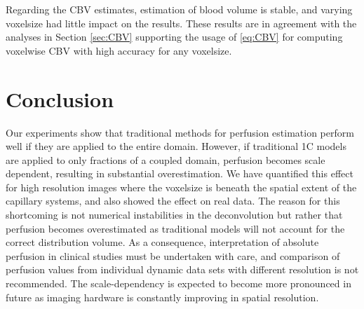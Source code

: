\documentclass[final,5p,times,twocolumn]{elsarticle}
\begin{document}
	Regarding the CBV estimates, estimation of blood volume is stable, and varying voxelsize had little impact on the results. These results are in agreement with the analyses in Section \ref{sec:CBV} supporting the usage of \eqref{eq:CBV} for computing voxelwise CBV with high accuracy for any voxelsize.
	
	\section{Conclusion}
	Our experiments show that traditional methods for perfusion estimation perform well if they are applied to the entire domain.
	However, if traditional 1C models are applied to only fractions of a coupled domain, perfusion becomes scale dependent, resulting in substantial overestimation.
	We have quantified this effect for high resolution images where the voxelsize is beneath the spatial extent of the capillary systems, and also showed the effect on real data. The reason for this shortcoming is not numerical instabilities in the deconvolution but rather that perfusion becomes overestimated as traditional models will not account for the correct distribution volume. As a consequence, interpretation of absolute perfusion in clinical studies must be undertaken with care, and comparison of perfusion values from individual dynamic data sets with different resolution is not recommended. The scale-dependency is expected to become more pronounced in future as imaging hardware is constantly improving in spatial resolution.






 





\end{document}
